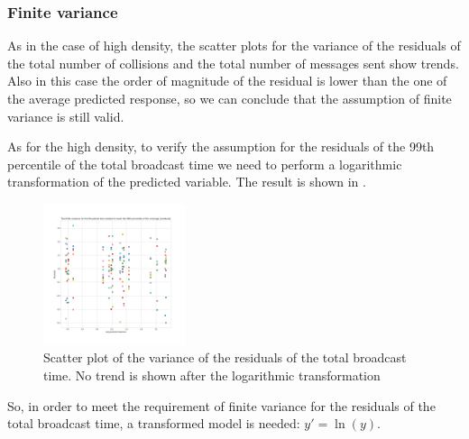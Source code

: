 \subsubsection{Finite variance}\label{ldassumptionsvariance}

As in the case of high density, the scatter plots for the variance of the
residuals of the total number of collisions and the total number of messages
sent show trends. Also in this case the order of magnitude of the residual is
lower than the one of the average predicted response, so we can conclude that
the assumption of finite variance is still valid.

As for the high density, to verify the assumption for the residuals of the 99th
percentile of the total broadcast time we need to perform a logarithmic
transformation of the predicted variable. The result is shown in
.

\begin{figure}[htb]
	\centering
	\includegraphics[width=0.37\textwidth]{img/ld/broadcasttime-variance-transform}
	\caption{Scatter plot of the variance of the residuals of the total
	broadcast time. No trend is shown after the logarithmic
	transformation}\label{fig:ldtimevariance}
\end{figure}

So, in order to meet the requirement of finite variance for the residuals of the
total broadcast time, a transformed model is needed: \(y' = \ln(y)\).

